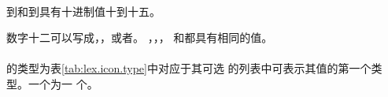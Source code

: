 \paragraph{} %
 到和到具有十进制值十到十五。

\begin{example}
  \begin{sloppypar}
    数字十二可以写成，，或者。
     ，，，
    和都具有相同的值。
  \end{sloppypar}
\end{example}

\paragraph{} %
的类型为表\ref{tab:lex.icon.type}中对应于其可选
的列表中可表示其值的第一个类型。一个为一
个\prvalue{}。

